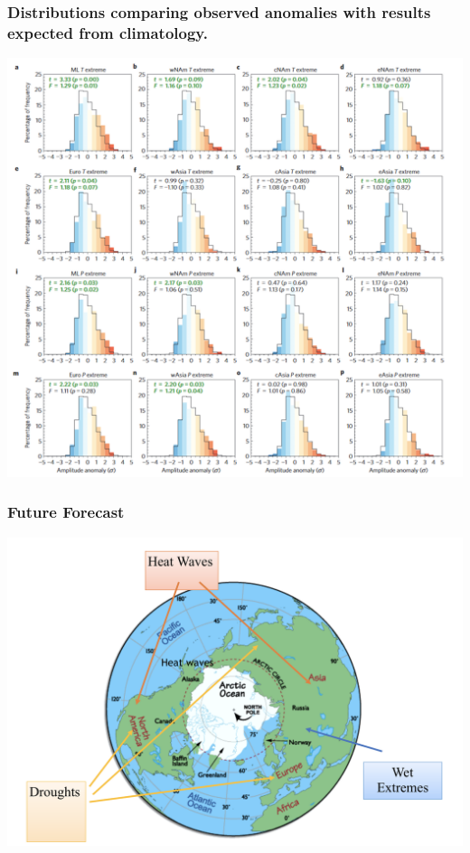 \documentclass[12pt]{beamer}
\begin{document}
\begin{frame}
\frametitle{Distributions comparing observed anomalies with results expected from climatology.}
\centering\includegraphics[scale=0.35]{Cathie7}
\end{frame}
\begin{frame}
\frametitle{Future Forecast}
\centering
\includegraphics[scale=0.3]{Cathie8}


\end{frame}
\end{document}
